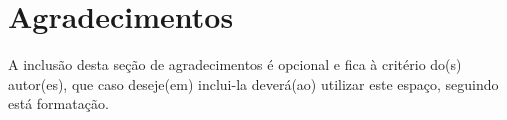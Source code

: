 
\section*{Agradecimentos}
A inclusão desta seção de agradecimentos é opcional e fica à critério do(s) autor(es), que caso deseje(em) inclui-la deverá(ao) utilizar este espaço, seguindo está formatação.
